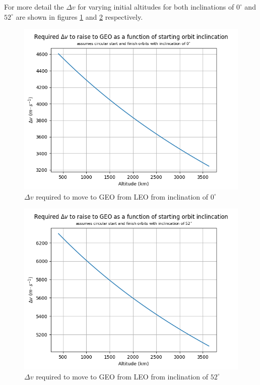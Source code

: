 \documentclass[a4paper, article, oneside, UKenglish]{memoir}
\newcommand{\0}{\mathbf{0}}
\newcommand{\1}{\mathbf{1}}
\begin{document}
For more detail the $ \Delta v $ for varying initial altitudes for both inclinations of $0^{\circ}$ and $52^{\circ}$ are shown in figures \ref{fig:deltav_incl0} and \ref{fig:deltav_incl52} respectively.

\begin{figure}[H]
    \centering
    \includegraphics[width=\textwidth]{deltav_incl0}
    \caption{$\Delta v$ required to move to GEO from LEO from inclination of $0^{\circ}$}
    \label{fig:deltav_incl0}
\end{figure}


\begin{figure}[H]
    \centering
    \includegraphics[width=\textwidth]{deltav_incl52}
    \caption{$\Delta v$ required to move to GEO from LEO from inclination of $52^{\circ}$}
    \label{fig:deltav_incl52}
\end{figure}
\end{document}

